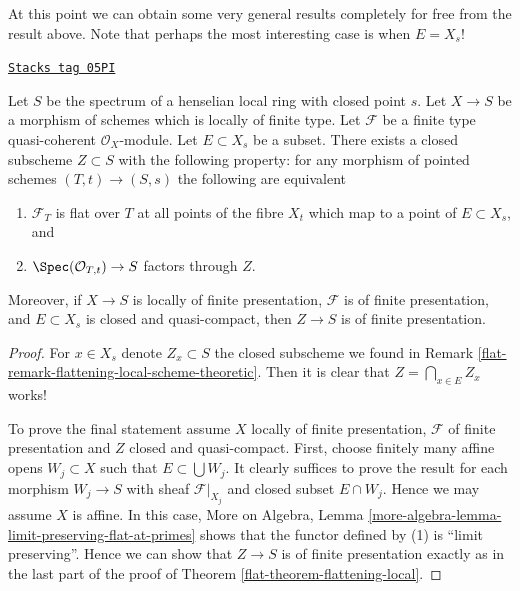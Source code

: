 At this point we can obtain some very general results completely
for free from the result above. Note that perhaps the most interesting
case is when $E = X_s$!

\begin{lemma}[Freebie]
\label{flat-lemma-freebie}
\href{https://stacks.math.columbia.edu/tag/05PI}{\texttt{Stacks tag 05PI}}

Let $S$ be the spectrum of a henselian local ring with closed point $s$.
Let $X \to S$ be a morphism of schemes which is locally of finite type.
Let $\mathcal{F}$ be a finite type quasi-coherent $\mathcal{O}_X$-module.
Let $E \subset X_s$ be a subset. There exists a closed subscheme
$Z \subset S$ with the following property: for any morphism of pointed
schemes $(T, t) \to (S, s)$ the following are equivalent
\begin{enumerate}
\item $\mathcal{F}_T$ is flat over $T$ at all points of the fibre
$X_t$ which map to a point of $E \subset X_s$, and
\item $\Spec(\mathcal{O}_{T, t}) \to S$ factors through $Z$.
\end{enumerate}
Moreover, if $X \to S$ is locally of finite presentation,
$\mathcal{F}$ is of finite presentation, and $E \subset X_s$ is
closed and quasi-compact, then $Z \to S$ is of finite presentation.
\end{lemma}

\begin{proof}

For $x \in X_s$ denote $Z_x \subset S$ the closed subscheme we found in
Remark \ref{flat-remark-flattening-local-scheme-theoretic}.
Then it is clear that $Z = \bigcap_{x \in E} Z_x$ works!

\medskip\noindent
To prove the final statement assume $X$ locally of finite presentation,
$\mathcal{F}$ of finite presentation and $Z$ closed and quasi-compact.
First, choose finitely many affine opens $W_j \subset X$ such that
$E \subset \bigcup W_j$. It clearly suffices to prove the
result for each morphism $W_j \to S$ with sheaf $\mathcal{F}|_{X_j}$
and closed subset $E \cap W_j$. Hence we may assume $X$ is affine.
In this case,
More on Algebra, Lemma \ref{more-algebra-lemma-limit-preserving-flat-at-primes}
shows that the functor defined by (1) is ``limit preserving''.
Hence we can show that $Z \to S$ is of finite presentation exactly
as in the last part of the proof of
Theorem \ref{flat-theorem-flattening-local}.
\end{proof}

